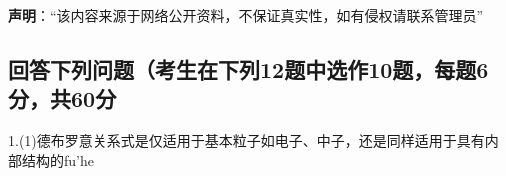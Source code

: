 
\textbf{声明}：“该内容来源于网络公开资料，不保证真实性，如有侵权请联系管理员”

\subsection{回答下列问题（考生在下列12题中选作10题，每题6分，共60分}

1.(1)德布罗意关系式是仅适用于基本粒子如电子、中子，还是同样适用于具有内部结构的fu'he